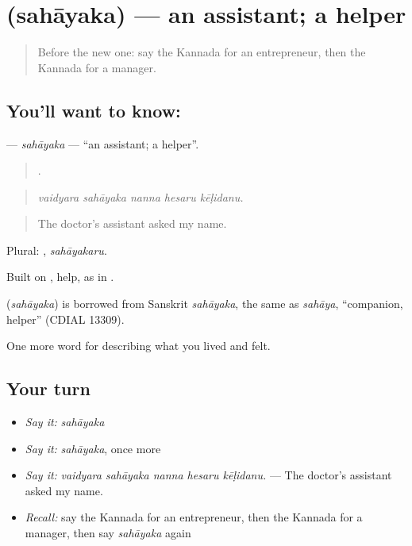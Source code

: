 \section[\texorpdfstring{\kn{ಸಹಾಯಕ} (sahāyaka)}{ಸಹಾಯಕ (sahāyaka)}]{ (sahāyaka) — an assistant; a helper}

\label{lesson:KA-C519-sahayaka}



\begin{quote}
Before the new one: say the Kannada for an entrepreneur, then the Kannada for a manager.
\end{quote}

\subsection*{You'll want to know: }
\textbf{} — \emph{sahāyaka} — \textquotedblleft{}an assistant; a helper\textquotedblright{}.

\begin{quote}
    .
\end{quote}

\begin{quote}
\emph{vaidyara sahāyaka nanna hesaru kēḷidanu.}
\end{quote}

\begin{quote}
The doctor's assistant asked my name.
\end{quote}

Plural: , \emph{sahāyakaru}.

Built on , help, as in  .

\begin{cousinweb}
\textbf{} (\emph{sahāyaka}) is borrowed from Sanskrit \emph{sahāyaka}, the same as \emph{sahāya}, \textquotedblleft{}companion, helper\textquotedblright{} (CDIAL 13309).
\end{cousinweb}

\begin{grammarlens}[title={What you've built}]
One more word for describing what you lived and felt.
\end{grammarlens}

\subsection*{Your turn}
\begin{itemize}
\raggedright
  \item \emph{Say it:} \emph{sahāyaka}
  \item \emph{Say it:} \emph{sahāyaka}, once more
  \item \emph{Say it:} \emph{vaidyara sahāyaka nanna hesaru kēḷidanu.} — The doctor's assistant asked my name.
  \item \emph{Recall:} say the Kannada for an entrepreneur, then the Kannada for a manager, then say \emph{sahāyaka} again
\end{itemize}

